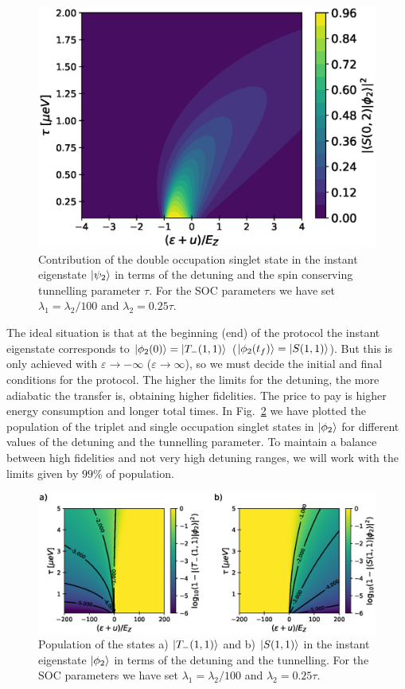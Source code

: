 \documentclass[a4paper,11pt]{article}
\begin{document}
\begin{figure}[!htbp]
	\centering
	\includegraphics[width=0.6\linewidth]{occupation_middle_state.eps}
	\caption{Contribution of the double occupation singlet state in the instant eigenstate $\ket{\psi_2}$ in terms of the detuning and the spin conserving tunnelling parameter $\tau$. For the SOC parameters we have set $\lambda_1=\lambda_2/100$ and $\lambda_2=0.25\tau$.}
	\label{fig:occupation_middle_state}
\end{figure}
The ideal situation is that at the beginning (end) of the protocol the instant eigenstate corresponds to $\ket{\phi_2(0)}=\ket{T_-(1,1)}$ ($\ket{\phi_2(t_f)}=\ket{S(1,1)}$). But this is only achieved with $\varepsilon\rightarrow -\infty$ ($\varepsilon\rightarrow \infty$), so we must decide the initial and final conditions for the protocol. The higher the limits for the detuning, the more adiabatic the transfer is, obtaining higher fidelities. The price to pay is higher energy consumption and longer total times. In Fig.~\ref{fig:limits_FAQUAD} we have plotted the population of the triplet and single occupation singlet states in $\ket{\phi_2}$ for different values of the detuning and the tunnelling parameter. To maintain a balance between high fidelities and not very high detuning ranges, we will work with the limits given by $99\%$ of population. 
\begin{figure}[!htbp]
	\centering
	\includegraphics[width=\linewidth]{limits_FAQUAD.eps}
	\caption{Population of the states a) $\ket{T_-(1,1)}$ and b) $\ket{S(1,1)}$ in the instant eigenstate $\ket{\phi_2}$ in terms of the detuning and the tunnelling. For the SOC parameters we have set $\lambda_1=\lambda_2/100$ and $\lambda_2=0.25\tau$.}
	\label{fig:limits_FAQUAD}
\end{figure}
\end{document}

